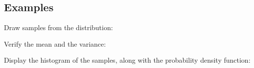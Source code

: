 \documentclass[letterpaper,10pt,english]{sphinxmanual}
\begin{document}
\begin{fulllineitems}
\subsection{Examples}
\label{\detokenize{myfpga:examples}}
\sphinxAtStartPar
Draw samples from the distribution:

\begin{sphinxVerbatim}[commandchars=\\\{\}]
     
    
\end{sphinxVerbatim}

\sphinxAtStartPar
Verify the mean and the variance:

\begin{sphinxVerbatim}[commandchars=\\\{\}]
  
\end{sphinxVerbatim}

\begin{sphinxVerbatim}[commandchars=\\\{\}]
   
\end{sphinxVerbatim}

\sphinxAtStartPar
Display the histogram of the samples, along with
the probability density function:


\end{fulllineitems}
\end{document}
